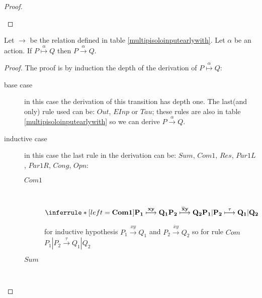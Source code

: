 \begin{proposition}
\begin{proof}
\begin{description}
    \end{description}
  \end{proof}
\end{proposition}






\begin{proposition}
  Let $\rightarrow$ be the relation defined in table \ref{multipisoloinputearlywith}. Let $\alpha$ be an action. If $P \stackrel{\alpha}{\longmapsto} Q$ then $P\xrightarrow{\alpha} Q$.
  \begin{proof}
    The proof is by induction the depth of the derivation of $P \stackrel{\alpha}{\longmapsto} Q$:
    \begin{description}
      \item[base case]
	in this case the derivation of this transition has depth one. The last(and only) rule used can be: $Out$, $EInp$ or $Tau$; these rules are also in table \ref{multipisoloinputearlywith} so we can derive $P\xrightarrow{\alpha} Q$. 
      \item[inductive case]
	in this case the last rule in the derivation can be: $Sum$, $Com1$, $Res$, $Par1L$, $Par1R$, $Cong$, $Opn$:
	\begin{description}
	  \item[$Com1$]\hfill \\
	    \begin{center}
	      $$ 
	    \end{center}
	    for inductive hypothesis $P_{1}  Q_{1}$ and $P_{2}  Q_{2}$ so for rule $Com$ $P_{1}|P_{2} \xrightarrow{\tau} Q_{1}|Q_{2}$
	  \item[$Sum$]\hfill \\
	    \begin{center}

\end{center}
\end{description}
\end{description}
\end{proof}
\end{proposition}
